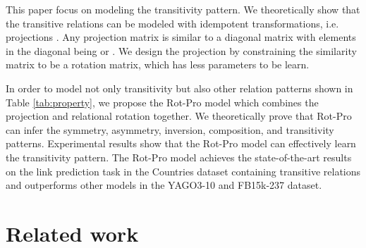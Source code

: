 \documentclass{article}
\begin{document}
\begin{table}[t]
\caption{Common relation patterns.}
  \label{tab:property}
  \centering
\end{table}

This paper focus on modeling the transitivity pattern. We theoretically show that the transitive relations can be modeled with idempotent transformations, i.e. projections \cite{valenza2012linear}. Any projection matrix is similar to a diagonal matrix with elements in the diagonal being  or . We design the projection by constraining the similarity matrix to be a rotation matrix, which has less parameters to be learn.

In order to model not only transitivity but also other relation patterns shown in Table \ref{tab:property}, we propose the Rot-Pro model which combines the projection and relational rotation together. We theoretically prove that Rot-Pro can infer the symmetry, asymmetry, inversion, composition, and transitivity patterns. Experimental results show that the Rot-Pro model can effectively learn the transitivity pattern. The Rot-Pro model achieves the state-of-the-art results on the link prediction task in the Countries dataset containing transitive relations and outperforms other models in the YAGO3-10 and FB15k-237 dataset.


\section{Related work}
\label{related_work}
\end{document}
